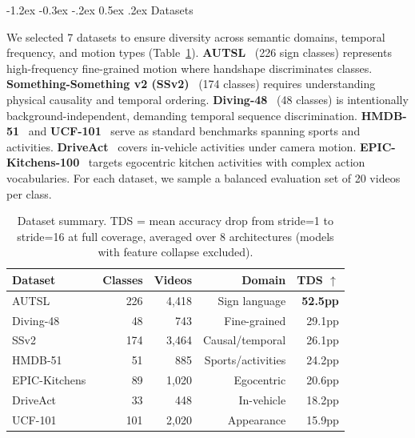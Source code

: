 \documentclass[runningheads]{llncs}
\makeatletter
\renewcommand\subsection{\@startsection{subsection}{2}{\z@}%
                       {-1.2ex \@plus -0.3ex \@minus -.2ex}%
                       {0.5ex \@plus .2ex}%
                       {\normalfont\normalsize\bfseries\boldmath}}
\newcommand{\tabtight}{\setlength{\tabcolsep}{3.5pt}\renewcommand{\arraystretch}{1.12}}
\newcommand{\TDS}{\textsc{TDS}}
\makeatother
\begin{document}
\subsection{Datasets}

We selected 7 datasets to ensure diversity across semantic domains, temporal frequency,
and motion types (Table~\ref{tab:datasets}).
\textbf{AUTSL}~\cite{sincan2020autsl} (226 sign classes) represents high-frequency
fine-grained motion where handshape discriminates classes.
\textbf{Something-Something v2 (SSv2)}~\cite{goyal2017ssv2} (174 classes) requires
understanding physical causality and temporal ordering.
\textbf{Diving-48}~\cite{li2018diving48} (48 classes) is intentionally
background-independent, demanding temporal sequence discrimination.
\textbf{HMDB-51}~\cite{kuehne2011hmdb} and \textbf{UCF-101}~\cite{soomro2012ucf101}
serve as standard benchmarks spanning sports and activities.
\textbf{DriveAct}~\cite{martin2019driveact} covers in-vehicle activities under camera
motion.
\textbf{EPIC-Kitchens-100}~\cite{damen2022epic} targets egocentric kitchen activities
with complex action vocabularies.
For each dataset, we sample a balanced evaluation set of 20 videos per class.

\begin{table}[t]
\centering
\caption{Dataset summary. \TDS{} = mean accuracy drop from stride=1 to stride=16 at
  full coverage, averaged over 8 architectures (models with feature collapse excluded).}
\label{tab:datasets}
\scriptsize\tabtight
\begin{tabular}{l r r r r}
\toprule
Dataset & Classes & Videos & Domain & \TDS{} $\uparrow$ \\
\midrule
AUTSL~\cite{sincan2020autsl}         & 226 & 4{,}418 & Sign language & \textbf{52.5pp} \\
Diving-48~\cite{li2018diving48}      &  48 &   743   & Fine-grained  & 29.1pp \\
SSv2~\cite{goyal2017ssv2}            & 174 & 3{,}464 & Causal/temporal & 26.1pp \\
HMDB-51~\cite{kuehne2011hmdb}        &  51 &   885   & Sports/activities & 24.2pp \\
EPIC-Kitchens~\cite{damen2022epic}   &  89 & 1{,}020 & Egocentric   & 20.6pp \\
DriveAct~\cite{martin2019driveact}   &  33 &   448   & In-vehicle   & 18.2pp \\
UCF-101~\cite{soomro2012ucf101}      & 101 & 2{,}020 & Appearance   & 15.9pp \\
\bottomrule
\end{tabular}
\end{table}
\end{document}
